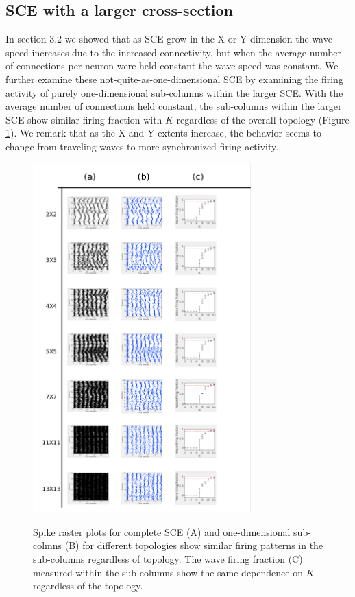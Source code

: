 \documentclass[12pt]{article}
\begin{document}
\subsection*{SCE with a larger cross-section}
In section 3.2 we showed that as SCE grow in the X or Y dimension the wave speed increases due to the increased connectivity, but when the average number of connections per neuron were held constant the wave speed was constant.
We further examine these not-quite-as-one-dimensional SCE by examining the firing activity of purely one-dimensional sub-columns within the larger SCE.
With the average number of connections held constant, the sub-columns within the larger SCE show similar firing fraction with $K$ regardless of the overall topology (Figure \ref{fig:LargeSCESubcolumns}).
We remark that as the X and Y extents increase, the behavior seems to change from traveling waves to more synchronized firing activity.
\begin{figure}[!htb]
 \caption{ Spike raster plots for complete SCE (A) and one-dimensional sub-colmns (B) for different topologies show similar firing patterns in the sub-columns regardless  of topology. 
           The wave firing fraction (C) measured within the sub-columns show the same dependence on $K$ regardless of the topology.}
   \includegraphics[width=0.75\textwidth]{fig/WaveFractionVsThick}
   \label{fig:LargeSCESubcolumns}
\end{figure}
\FloatBarrier

\color{black}
\end{document}
